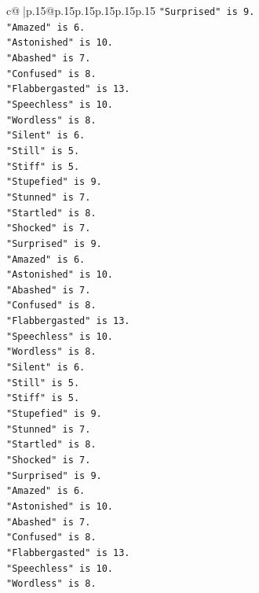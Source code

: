 \documentclass{article}
\begin{document}
{\begin{supertabular}{c@{$\;$}|p{.15\linewidth}@{}p{.15\linewidth}p{.15\linewidth}p{.15\linewidth}p{.15\linewidth}p{.15\linewidth}}
{{{\texttt{"Surprised" is 9.} \\
\texttt{"Amazed" is 6.} \\
\texttt{"Astonished" is 10.} \\
\texttt{"Abashed" is 7.} \\
\texttt{"Confused" is 8.} \\
\texttt{"Flabbergasted" is 13.} \\
\texttt{"Speechless" is 10.} \\
\texttt{"Wordless" is 8.} \\
\texttt{"Silent" is 6.} \\
\texttt{"Still" is 5.} \\
\texttt{"Stiff" is 5.} \\
\texttt{"Stupefied" is 9.} \\
\texttt{"Stunned" is 7.} \\
\texttt{"Startled" is 8.} \\
\texttt{"Shocked" is 7.} \\
\texttt{"Surprised" is 9.} \\
\texttt{"Amazed" is 6.} \\
\texttt{"Astonished" is 10.} \\
\texttt{"Abashed" is 7.} \\
\texttt{"Confused" is 8.} \\
\texttt{"Flabbergasted" is 13.} \\
\texttt{"Speechless" is 10.} \\
\texttt{"Wordless" is 8.} \\
\texttt{"Silent" is 6.} \\
\texttt{"Still" is 5.} \\
\texttt{"Stiff" is 5.} \\
\texttt{"Stupefied" is 9.} \\
\texttt{"Stunned" is 7.} \\
\texttt{"Startled" is 8.} \\
\texttt{"Shocked" is 7.} \\
\texttt{"Surprised" is 9.} \\
\texttt{"Amazed" is 6.} \\
\texttt{"Astonished" is 10.} \\
\texttt{"Abashed" is 7.} \\
\texttt{"Confused" is 8.} \\
\texttt{"Flabbergasted" is 13.} \\
\texttt{"Speechless" is 10.} \\
\texttt{"Wordless" is 8.} \\
}}}
\end{supertabular}}
\end{document}
